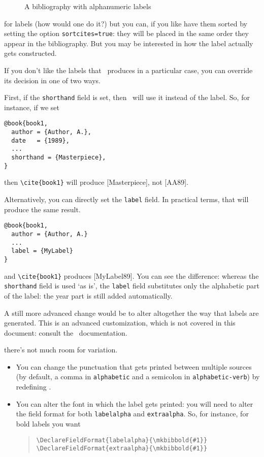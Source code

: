 \begin{figure}
\caption{A bibliography with alphanumeric
  labels\label{example:bibliography:alphabetic}}
\end{figure}

 for labels (how
would one do it?) but you can, if you like have them sorted by setting
the option \verb|sortcites=true|: they will be placed in the same
order they appear in the bibliography. But you may be interested in
how the label actually gets constructed.

If you don't like the labels that \biblatex\ produces in a particular
case, you can override its decision in one of two ways.

First, if the \verb|shorthand| field is set, then \biblatex\ will use
it instead of the label. So, for instance, if we set
\begin{verbatim}
@book{book1,
  author = {Author, A.},
  date   = {1989},
  ...
  shorthand = {Masterpiece},
}
\end{verbatim}
then \verb|\cite{book1}| will produce [Masterpiece], not [AA89].

Alternatively, you can directly set the \verb|label| field. In
practical terms, that will produce the same result.
\begin{verbatim}
@book{book1,
  author = {Author, A.} 
  ...
  label = {MyLabel}
}
\end{verbatim}
and \verb|\cite{book1}| produces [MyLabel89]. You can see the difference:
whereas the \verb|shorthand| field is used `as is', the \verb|label|
field substitutes only the alphabetic part of the label: the year part
is still added automatically.

A still more advanced change would be to alter altogether the way that
labels are generated. This is an advanced customization, which is not
covered in this document: consult the \biblatex\ documentation.

 there's not much room for
variation.
\begin{itemize}
\item You can change the punctuation that gets printed between
multiple sources (by default, a comma in \verb|alphabetic| and a
semicolon in \verb|alphabetic-verb|) by redefining
.
\item You can alter the font in which the label gets printed: you will
  need to alter the field format for both \verb|labelalpha| and
  \verb|extraalpha|. So, for instance, for bold labels you want
\begin{quote}
\verb|\DeclareFieldFormat{labelalpha}{\mkbibbold{#1}}|\\
\verb|\DeclareFieldFormat{extraalpha}{\mkbibbold{#1}}|
\end{quote}
\end{itemize}

